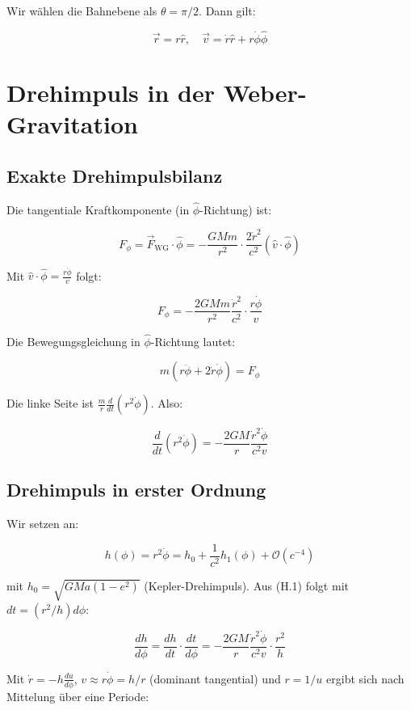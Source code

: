 Wir wählen die Bahnebene als \( \theta = \pi/2 \). Dann gilt:

\[
\vec{r} = r \hat{r}, \quad \vec{v} = \dot{r} \hat{r} + r\dot{\phi} \hat{\phi}
\]

\section{Drehimpuls in der Weber-Gravitation}
\label{app:periheldrehung_drehimpuls}

\subsection{Exakte Drehimpulsbilanz}
\label{sub:periheldrehung_drehimpuls_exakt}

Die tangentiale Kraftkomponente (in \( \hat{\phi} \)-Richtung) ist:

\[
F_{\phi} = \vec{F}_{\text{WG}} \cdot \hat{\phi} = -\frac{GMm}{r^2} \cdot \frac{2\dot{r}^2}{c^2} (\hat{v} \cdot \hat{\phi})
\]

Mit \( \hat{v} \cdot \hat{\phi} = \frac{r\dot{\phi}}{v} \) folgt:

\[
F_{\phi} = -\frac{2GMm}{r^2} \frac{\dot{r}^2}{c^2} \cdot \frac{r\dot{\phi}}{v}
\]

Die Bewegungsgleichung in \( \hat{\phi} \)-Richtung lautet:

\[
m(r\ddot{\phi} + 2\dot{r}\dot{\phi}) = F_{\phi}
\]

Die linke Seite ist \( \frac{m}{r} \frac{d}{dt}(r^2\dot{\phi}) \). Also:

\[
\frac{d}{dt}(r^2\dot{\phi}) = -\frac{2GM}{r} \frac{\dot{r}^2 \dot{\phi}}{c^2 v} \tag{H.1}
\]

\subsection{Drehimpuls in erster Ordnung}
\label{sub:periheldrehung_drehimpuls_ordnung}

Wir setzen an:

\[
h(\phi) = r^2\dot{\phi} = h_0 + \frac{1}{c^2} h_1(\phi) + \mathcal{O}(c^{-4})
\]

mit \( h_0 = \sqrt{G M a(1-e^2)} \) (Kepler-Drehimpuls). Aus (H.1) folgt mit 
\( dt = (r^2/h) d\phi \):

\[
\frac{dh}{d\phi} = \frac{dh}{dt} \cdot \frac{dt}{d\phi} = -\frac{2GM}{r} \frac{\dot{r}^2 \dot{\phi}}{c^2 v} \cdot \frac{r^2}{h}
\]

Mit \( \dot{r} = -h \frac{du}{d\phi} \), \( v \approx r\dot{\phi} = h/r \) (dominant 
tangential) und \( r = 1/u \) ergibt sich nach Mittelung über eine Periode:

